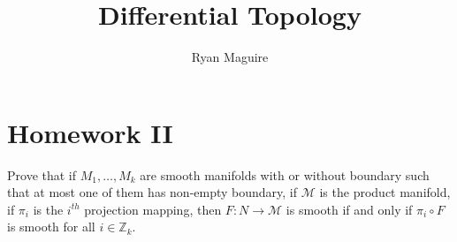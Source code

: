 \documentclass{article}                                                        %
\begin{document}
    \title{Differential Topology}
    \author{Ryan Maguire}
    \date{\vspace{-5ex}}
    \maketitle
    \section{Homework II}
        \begin{problem}
            Prove that if $M_{1},\dots,M_{k}$ are smooth manifolds with or
            without boundary such that at most one of them has non-empty
            boundary, if $\mathcal{M}$ is the product manifold, if $\pi_{i}$
            is the $i^{th}$ projection mapping, then $F:N\rightarrow\mathcal{M}$
            is smooth if and only if $\pi_{i}\circ{F}$ is smooth for all
            $i\in\mathbb{Z}_{k}$.
        \end{problem}
\end{document}
